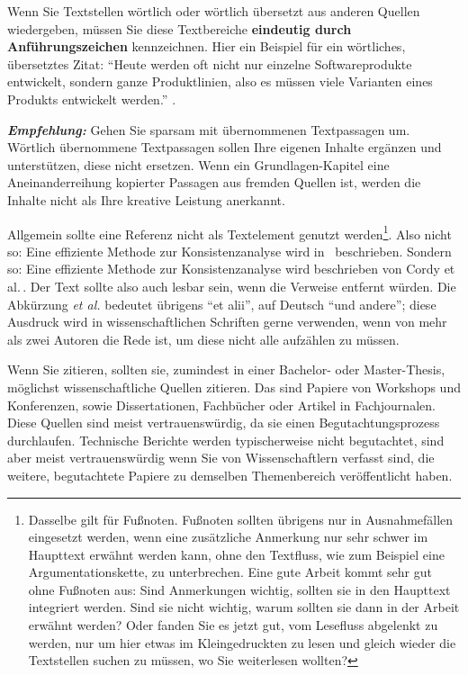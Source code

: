 Wenn Sie Textstellen wörtlich oder wörtlich übersetzt aus anderen Quellen wiedergeben, müssen Sie diese Textbereiche \textbf{eindeutig durch Anführungszeichen} kennzeichnen.
Hier ein Beispiel für ein wörtliches, übersetztes Zitat: \enquote{Heute werden oft nicht nur einzelne Softwareprodukte entwickelt, sondern ganze Produktlinien, also es müssen viele Varianten eines Produkts entwickelt werden.} \cite[Seite~1]{Greenyer2013}.

\textbf{\textit{Empfehlung:}} Gehen Sie sparsam mit übernommenen Textpassagen um. Wörtlich übernommene Textpassagen sollen Ihre eigenen Inhalte ergänzen und unterstützen, diese nicht ersetzen. Wenn ein Grundlagen-Kapitel eine Aneinanderreihung kopierter Passagen aus fremden Quellen ist, werden die Inhalte nicht als Ihre kreative Leistung anerkannt.

Allgemein sollte eine Referenz nicht als Textelement genutzt werden\footnote{Dasselbe gilt für Fußnoten. Fußnoten sollten übrigens nur in Ausnahmefällen eingesetzt werden, wenn eine zusätzliche Anmerkung nur sehr schwer im Haupttext erwähnt werden kann, ohne den Textfluss, wie zum Beispiel eine Argumentationskette, zu unterbrechen. Eine gute Arbeit kommt sehr gut ohne Fußnoten aus: Sind Anmerkungen wichtig, sollten sie in den Haupttext integriert werden. Sind sie nicht wichtig, warum sollten sie dann in der Arbeit erwähnt werden? Oder fanden Sie es jetzt gut, vom Lesefluss abgelenkt zu werden, nur um hier etwas im Kleingedruckten zu lesen und gleich wieder die Textstellen suchen zu müssen, wo Sie weiterlesen wollten?}. Also nicht so: Eine effiziente Methode zur Konsistenzanalyse wird in~\cite{Cordy2012} beschrieben. Sondern so: Eine effiziente Methode zur Konsistenzanalyse wird beschrieben von Cordy et al.\,\cite{Cordy2012}. Der Text sollte also auch lesbar sein, wenn die Verweise entfernt würden. Die Abkürzung \textit{et al.} bedeutet übrigens \enquote{et alii}, auf Deutsch \enquote{und andere}; diese Ausdruck wird in wissenschaftlichen Schriften gerne verwenden, wenn von mehr als zwei Autoren die Rede ist, um diese nicht alle aufzählen zu müssen.

Wenn Sie zitieren, sollten sie, zumindest in einer Bachelor- oder Master-Thesis, möglichst wissenschaftliche Quellen zitieren. Das sind Papiere von Workshops und Konferenzen, sowie Dissertationen, Fachbücher oder Artikel in Fachjournalen. Diese Quellen sind meist vertrauenswürdig, da sie einen Begutachtungsprozess durchlaufen. Technische Berichte werden typischerweise nicht begutachtet, sind aber meist vertrauenswürdig wenn Sie von Wissenschaftlern verfasst sind, die weitere, begutachtete Papiere zu demselben Themenbereich veröffentlicht haben.

